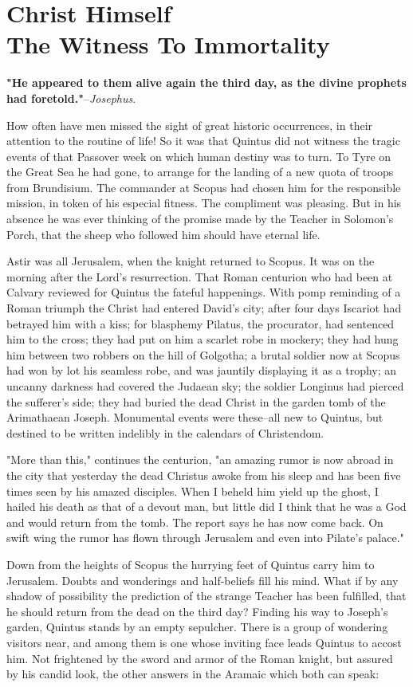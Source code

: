 \chapter*{Christ Himself\\The Witness To Immortality}
\textbf{"He appeared to them alive again the third day, as the divine
prophets had foretold."}--\textit{Josephus}.


How often have men missed the sight of great historic occurrences,
in their attention to the routine of life!  So it was that Quintus
did not witness the tragic events of that Passover week on which
human destiny was to turn.  To Tyre on the Great Sea he had gone,
to arrange for the landing of a new quota of troops from
Brundisium.  The commander at Scopus had chosen him for the
responsible mission, in token of his especial fitness.  The
compliment was pleasing.  But in his absence he was ever thinking
of the promise made by the Teacher in Solomon's Porch, that the
sheep who followed him should have eternal life.

Astir was all Jerusalem, when the knight returned to Scopus.  It
was on the morning after the Lord's resurrection.  That Roman
centurion who had been at Calvary reviewed for Quintus the fateful
happenings.  With pomp reminding of a Roman triumph the Christ had
entered David's city; after four days Iscariot had betrayed him
with a kiss; for blasphemy Pilatus, the procurator, had sentenced
him to the cross; they had put on him a scarlet robe in mockery;
they had hung him between two robbers on the hill of Golgotha; a
brutal soldier now at Scopus had won by lot his seamless robe, and
was jauntily displaying it as a trophy; an uncanny darkness had
covered the Judaean sky; the soldier Longinus had pierced the
sufferer's side; they had buried the dead Christ in the garden tomb
of the Arimathaean Joseph.  Monumental events were these--all new
to Quintus, but destined to be written indelibly in the calendars
of Christendom.

"More than this," continues the centurion, "an amazing rumor is now
abroad in the city that yesterday the dead Christus awoke from his
sleep and has been five times seen by his amazed disciples.  When I
beheld him yield up the ghost, I hailed his death as that of a
devout man, but little did I think that he was a God and would
return from the tomb.  The report says he has now come back.  On
swift wing the rumor has flown through Jerusalem and even into
Pilate's palace."


Down from the heights of Scopus the hurrying feet of Quintus carry
him to Jerusalem.  Doubts and wonderings and half-beliefs fill his
mind.  What if by any shadow of possibility the prediction of the
strange Teacher has been fulfilled, that he should return from the
dead on the third day?  Finding his way to Joseph's garden, Quintus
stands by an empty sepulcher.  There is a group of wondering
visitors near, and among them is one whose inviting face leads
Quintus to accost him.  Not frightened by the sword and armor of
the Roman knight, but assured by his candid look, the other answers
in the Aramaic which both can speak:

